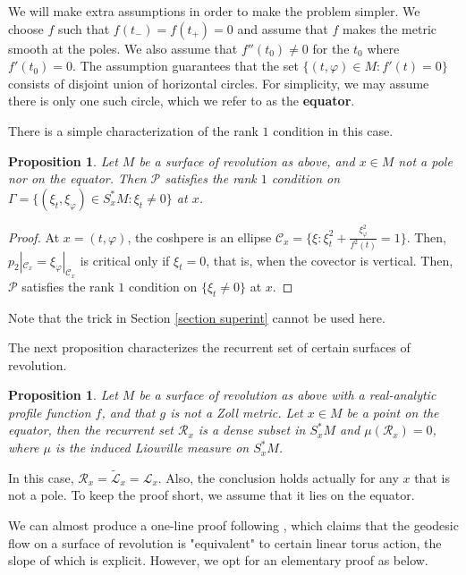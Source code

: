 \documentclass[12pt,reqno]{amsart}
\renewcommand{\phi}{\varphi}
\newtheorem{prop}[cor]{{\sc Proposition}}
\numberwithin{equation}{section}
\newenvironment{rem}{\medskip\noindent{\it Remark:\/} }{\medskip}
\begin{document}
We will make extra assumptions in order to make the problem simpler. We choose $f$ such that $f(t_-)=f(t_+)=0$ and assume that $f$ makes the metric smooth at the poles. We also assume that $f''(t_0)\neq 0$ for the $t_0$ where $f'(t_0)=0$. The assumption guarantees that the set $\{(t,\phi)\in M:f'(t)=0\}$ consists of disjoint union of horizontal circles. For simplicity, we may assume there is only one such circle, which we refer to as the \textbf{equator}.

There is a simple characterization of the rank $1$ condition in this case.

\begin{prop}\label{SOR degen}
    Let $M$ be a surface of revolution as above, and $x\in M$ not a pole nor on the equator. Then $\mathcal{P}$ satisfies the rank $1$ condition on $\Gamma=\{(\xi_t,\xi_{\phi})\in S^*_xM: \xi_t\neq 0\}$ at $x$.
\end{prop}

\begin{proof}
    At $x=(t,\phi)$, the coshpere is an ellipse $\mathcal{C}_x=\{\xi:\xi_t^2+\frac{\xi_{\phi}^2}{f^2(t)}=1\}$. Then, ${p_2}|_{\mathcal{C}_x}=\xi_{\phi}|_{\mathcal{C}_x}$ is critical only if $\xi_{t}=0$, that is, when the covector is vertical. Then, $\mathcal{P}$ satisfies the rank $1$ condition on $\{\xi_t\neq 0\}$ at $x$.  
\end{proof}

\begin{rem}
    Note that the trick in Section \ref{section superint} cannot be used here.
\end{rem}

The next proposition characterizes the recurrent set of certain surfaces of revolution.

\begin{prop}\label{SOR recur}
    Let $M$ be a surface of revolution as above with a real-analytic profile function $f$, and that $g$ is not a Zoll metric. Let $x\in M$ be a point on the equator, then the recurrent set $\mathcal{R}_x$ is a dense subset in $S^*_xM$ and $\mu(\mathcal{R}_x)=0$, where $\mu$ is the induced Liouville measure on $S^*_xM$.
\end{prop}

\begin{rem}
    In this case, $\mathcal{R}_x=\widetilde{\mathcal{L}}_x=\mathcal{L}_x$. Also, the conclusion holds actually for any $x$ that is not a pole. To keep the proof short, we assume that it lies on the equator. 
    
    We can almost produce a one-line proof following \cite[Thm 3.5.24]{Kli95}, which claims that the geodesic flow on a surface of revolution is "equivalent" to certain linear torus action, the slope of which is explicit. However, we opt for an elementary proof as below.
\end{rem}
\end{document}
